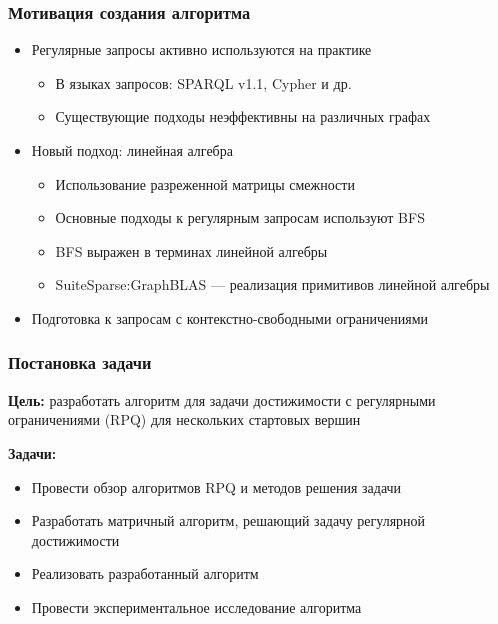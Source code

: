 \documentclass{beamer}
\begin{document}
\begin{frame}[fragile]  
  \frametitle{Мотивация создания алгоритма}
  \noindent\begin{minipage}{1\textwidth}
  \begin{itemize}
    \item Регулярные запросы активно используются на практике
    \begin{itemize}
        \item В языках запросов: SPARQL v1.1, Cypher и др. 
        \item Существующие подходы неэффективны на различных графах
    \end{itemize}
    \item Новый подход: линейная алгебра
    \begin{itemize}
        \item Использование разреженной матрицы смежности
        \item Основные подходы к регулярным запросам используют BFS
        \item BFS выражен в терминах линейной алгебры
        \item SuiteSparse:GraphBLAS --- реализация примитивов линейной алгебры
    \end{itemize}
    
    \item Подготовка к запросам с контекстно-свободными ограничениями

  \end{itemize}
  \end{minipage}
  \noindent\begin{minipage}{0.4\textwidth}
  
\end{minipage}
\end{frame}



\begin{frame}
  \frametitle{Постановка задачи}
  \textbf{Цель:} разработать алгоритм для задачи достижимости с регулярными ограничениями (RPQ) для нескольких стартовых вершин

  \textbf{Задачи:}
  \begin{itemize}
    \item Провести обзор алгоритмов RPQ и методов решения задачи
    \item Разработать матричный алгоритм, решающий задачу регулярной достижимости
    \item Реализовать разработанный алгоритм
    \item Провести экспериментальное исследование алгоритма
  \end{itemize}
\end{frame}
            
\end{document}
